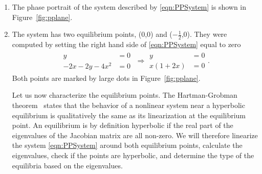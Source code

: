 \documentclass[a4paper]{article} %
\begin{document}
\begin{enumerate}
  \item The phase portrait of the system described by \eqref{eqn:PPSystem} is shown in Figure~\ref{fig:pplane}.

  \item The system has two equilibrium points, \mbox{(0,0)} and \mbox{($-\frac{1}{2}$,0)}.  They were computed by setting the right hand side of \eqref{eqn:PPSystem} equal to zero
\begin{align*}
    \begin{array}{rl}
    y & =0  \\
    -2x -2y -4 x^2 & = 0
    \end{array} \; \Rightarrow
    \begin{array}{rl}
      y & =0 \\
      x (1+2x) & =0
    \end{array}.
\end{align*}
Both points are marked by large dots in Figure~\ref{fig:pplane}.

Let us now characterize the equilibrium points. The Hartman-Grobman theorem~\cite[p. 288]{Sastry:1999:Nonlinear-systems:-analysis-stability-and-control:xr} states that the behavior of a nonlinear system near a hyperbolic equilibrium is qualitatively the same as its linearization at the equilibrium point. An equilibrium is by definition hyperbolic if the real part of the eigenvalues of the Jacobian matrix are all non-zero. We will therefore linearize the system \eqref{eqn:PPSystem} around both equilibrium points, calculate the eigenvalues, check if the points are hyperbolic, and determine the type of the equilibria based on the eigenvalues.


\end{enumerate}
\end{document}
